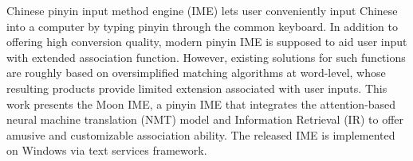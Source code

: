 Chinese pinyin input method engine (IME) lets user conveniently input Chinese into a computer by typing pinyin through the common keyboard. In addition to offering high conversion quality, modern pinyin IME is supposed to aid user input with extended association function. However, existing solutions for such functions are roughly based on oversimplified matching algorithms at word-level, whose resulting products provide limited extension associated with user inputs. This work presents the Moon IME, a pinyin IME that integrates the attention-based neural machine translation (NMT) model and Information Retrieval (IR) to offer amusive and customizable association ability. The released IME is implemented on Windows via text services framework.

